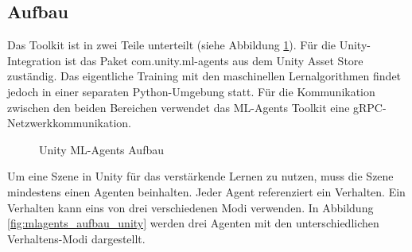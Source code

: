 \subsection{Aufbau}
Das Toolkit ist in zwei Teile unterteilt (siehe Abbildung \ref{fig:mlagents_aufbau}). Für die Unity-Integration ist das Paket com.unity.ml-agents aus dem Unity Asset Store zuständig. Das eigentliche Training mit den maschinellen Lernalgorithmen findet jedoch in einer separaten Python-Umgebung statt. Für die Kommunikation zwischen den beiden Bereichen verwendet das ML-Agents Toolkit eine gRPC-Netzwerkkommunikation.\cite{juliani2020}

\begin{figure}[H]
  \centering  
  \caption{Unity ML-Agents Aufbau}
  \label{fig:mlagents_aufbau}
\end{figure}

Um eine Szene in Unity für das verstärkende Lernen zu nutzen, muss die Szene mindestens einen Agenten beinhalten. Jeder Agent referenziert ein Verhalten. Ein Verhalten kann eins von drei verschiedenen Modi verwenden. In Abbildung \ref{fig:mlagents_aufbau_unity} werden drei Agenten mit den unterschiedlichen Verhaltens-Modi dargestellt.

